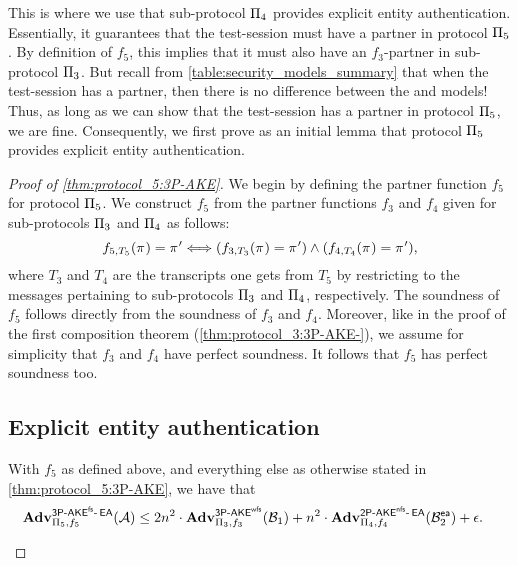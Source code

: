 This is where we use that sub-protocol $\protocol_4$ provides explicit entity authentication.
Essentially,
it guarantees that the test-session must have a partner in protocol $\protocol_5$.
By definition of $f_5$,
this implies that it must also have an $f_3$-partner in sub-protocol $\protocol_3$.
But recall from \cref{table:security_models_summary} that when the test-session has a partner,
then there is no difference between the \akefstext and \akewfstext models!
Thus,
as long as we can show that the test-session has a partner in protocol $\protocol_5$,
we are fine.
Consequently,
we first prove as an initial lemma that protocol $\protocol_5$ provides explicit entity authentication.



\begin{proof}[Proof of \cref{thm:protocol_5:3P-AKE}]
We begin by defining the  partner function $f_5$  for protocol $\protocol_5$.
We construct $f_5$ from the partner functions $f_3$ and $f_4$ given for sub-protocols $\protocol_3$ and $\protocol_4$ 
as follows:
\begin{equation}
	f_{5,T_5}(\oracle) = \oracle' \Longleftrightarrow (f_{3,T_3}(\oracle) = \oracle') \land (f_{4,T_4}(\oracle) = \oracle')	,
\end{equation}
where $T_3$ and $T_4$ are the transcripts one gets from $T_5$ by restricting to the messages pertaining to sub-protocols $\protocol_3$ and $\protocol_4$,
respectively.
The soundness of $f_5$ follows directly from the soundness of $f_3$ and $f_4$. 
Moreover,
like in the proof of the first composition theorem (\cref{thm:protocol_3:3P-AKE-}),
we assume for simplicity that $f_3$ and $f_4$ have perfect soundness.
It follows that $f_5$ has perfect soundness too. 


\subsection{Explicit entity authentication}\label{sec:proof_of_EA_protocol_5}



\begin{lemma}\label{lemma:protocol_5:3P-AKE-EA}
With $f_5$ as defined above,
and everything else as otherwise stated in \cref{thm:protocol_5:3P-AKE},
we have that
\begin{equation*}
	\begin{split}
	\adv_{\protocol_5,f_5}^{\operatorname{\mathsf{3P-\akefs-\EA}}} (\A) 
		&\leq 2n^2 \cdot \adv_{\protocol_3, f_3}^{\operatorname{\mathsf{3P-\akewfs}}}(\A[B]_1) 
			+ n^2 \cdot \adv_{{\protocol_4},{f_4}}^{\operatorname{\mathsf{2P-\akenfs-\EA}}}(\A[B]_2^{\ea}) 
			+ \transcriptcollisionfunc .
	\end{split}
\end{equation*}
\end{lemma}


\end{proof}
